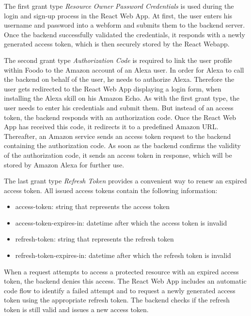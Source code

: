 The first grant type \textit{Resource Owner Password Credentials} is used during the login and sign-up process in the React Web App. At first, the user enters his username and password into a webform and submits them to the backend server. Once the backend successfully validated the credentials, it responds with a newly generated access token, which is then securely stored by the React Webapp. 

The second grant type \textit{Authorization Code} is required to link the user profile within Foodo to the Amazon account of an Alexa user. In order for Alexa to call the backend on behalf of the user, he needs to authorize Alexa. Therefore the user gets redirected to the React Web App displaying a login form, when installing the Alexa skill on his Amazon Echo. As with the first grant type, the user needs to enter his credentials and submit them. But instead of an access token, the backend responds with an authorization code. Once the React Web App has received this code, it redirects it to a predefined Amazon URL. Thereafter, an Amazon service sends an access token request to the backend containing the authorization code. As soon as the backend confirms the validity of the authorization code, it sends an access token in response, which will be stored by Amazon Alexa for further use. 

The last grant type \textit{Refresh Token} provides a convenient way to renew an expired access token. All issued access tokens contain the following information:
\vspace{-1em}
\begin{itemize}
	\itemsep-0.5em
	\item access-token: string that represents the access token
	\item access-token-expires-in: datetime after which the access token is invalid
	\item refresh-token: string that represents the refresh token
	\item refresh-token-expires-in: datetime after which the refresh token is invalid
\end{itemize}


When a request attempts to access a protected resource with an expired access token, the backend denies this access. The React Web App includes an automatic code flow to identify a failed attempt and to request a newly generated access token using the appropriate refresh token. The backend checks if the refresh token is still valid and issues a new access token.

